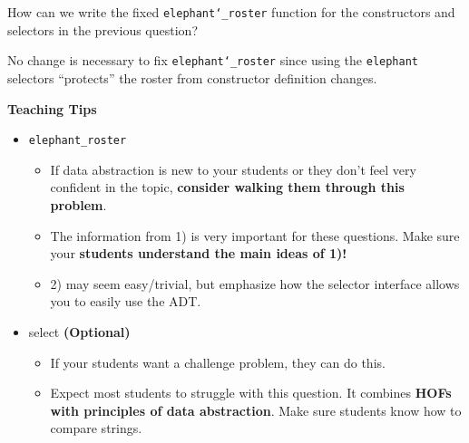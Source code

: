 \begin{blocksection}
\question How can we write the fixed \texttt{elephant\char`_roster} function for
the constructors and selectors in the previous question?

\begin{solution}[1.5in]
No change is necessary to fix \texttt{elephant\char`_roster} since using the
\texttt{elephant} selectors ``protects'' the roster from constructor definition
changes.
\end{solution}

\begin{guide}
\textbf{Teaching Tips}
\begin{itemize}
    \item \texttt{elephant\_roster}
    \begin{itemize}
        \item If data abstraction is new to your students or they don’t feel very confident in the topic, \textbf{consider walking them through this problem}.
        \item The information from 1) is very important for these questions. Make sure your \textbf{students understand the main ideas of 1)!}
        \item 2) may seem easy/trivial, but emphasize how the selector interface allows you to easily use the ADT.
    \end{itemize}
    \item select \textbf{(Optional)}
    \begin{itemize}
        \item If your students want a challenge problem, they can do this.
        \item Expect most students to struggle with this question. It combines \textbf{HOFs with principles of data abstraction}. Make sure students know how to compare strings.
    \end{itemize}
\end{itemize}
\end{guide}

\end{blocksection}

